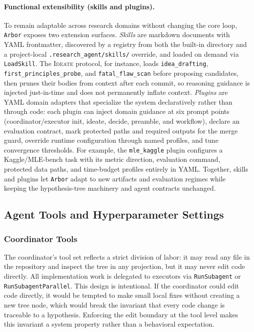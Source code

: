 \documentclass{llmxive}
\providecommand{\arbor}{\texttt{Arbor}}
\begin{document}
\paragraph{Functional extensibility (skills and plugins).}
To remain adaptable across research domains without changing the core loop,
\arbor{} exposes two extension surfaces. \emph{Skills} are markdown documents
with YAML frontmatter, discovered by a registry from both the built-in directory
and a project-local \texttt{.research\_agent/skills/} override, and loaded on
demand via \texttt{LoadSkill}. The \textsc{Ideate} protocol, for instance, loads
\texttt{idea\_drafting}, \texttt{first\_principles\_probe}, and
\texttt{fatal\_flaw\_scan} before proposing candidates, then prunes their bodies
from context after each commit, so reasoning guidance is injected just-in-time
and does not permanently inflate context. \emph{Plugins} are YAML domain
adapters that specialize the system declaratively rather than through code: each
plugin can inject domain guidance at six prompt points (coordinator/executor
init, ideate, decide, preamble, and workflow), declare an evaluation contract,
mark protected paths and required outputs for the merge guard, override runtime
configuration through named profiles, and tune convergence thresholds. For
example, the \texttt{mle\_kaggle} plugin configures a Kaggle/MLE-bench task with
its metric direction, evaluation command, protected data paths, and time-budget
profiles entirely in YAML. Together, skills and plugins let \arbor{} adapt to new
artifacts and evaluation regimes while keeping the hypothesis-tree machinery and
agent contracts unchanged.

\subsection{Agent Tools and Hyperparameter Settings}
\label{app:agent-tools-params}

\subsubsection{Coordinator Tools}
\label{app:meta-agent-tools}

The coordinator's tool set reflects a strict division of labor: it may read
any file in the repository and inspect the tree in any projection, but it
may never edit code directly. All implementation work is delegated to
executors via \texttt{RunSubagent} or \texttt{RunSubagentParallel}. This
design is intentional. If the coordinator could edit code directly, it
would be tempted to make small local fixes without creating a new tree
node, which would break the invariant that every code change is traceable
to a hypothesis. Enforcing the edit boundary at the tool level makes this
invariant a system property rather than a behavioral expectation.
\end{document}
